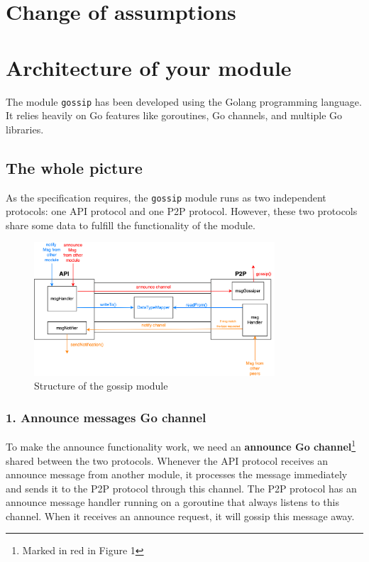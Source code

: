 \section{Change of assumptions}

\section{Architecture of your module}
The module \texttt{gossip} has been developed using the Golang programming language. It relies heavily on Go features like goroutines, Go channels, and multiple Go libraries. 

\subsection{The whole picture}

As the specification requires, the \texttt{gossip} module runs as two independent protocols: one API protocol and one P2P protocol. However, these two protocols share some data to fulfill the functionality of the module. 

\begin{figure}[H]
    \centering
    \includegraphics[width=0.8\textwidth]{pics/structure.png}
    \caption{Structure of the gossip module}
\end{figure}

\subsubsection{1. Announce messages Go channel}

To make the announce functionality work, we need an \textbf{announce Go channel}\footnote{Marked in red in Figure 1} shared between the two protocols. Whenever the API protocol receives an announce message from another module, it processes the message immediately and sends it to the P2P protocol through this channel. The P2P protocol has an announce message handler running on a goroutine that always listens to this channel. When it receives an announce request, it will gossip this message away. 

